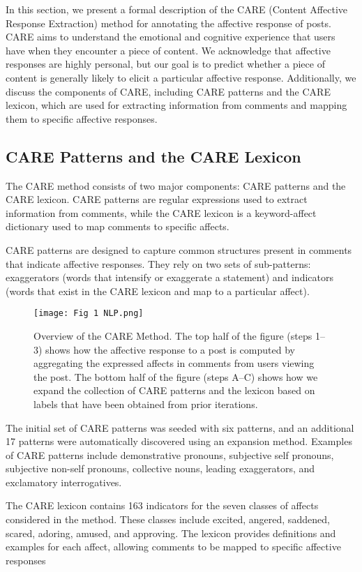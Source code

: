\documentclass[conference]{IEEEtran}
\begin{document}
In this section, we present a formal description of the CARE (Content Affective Response Extraction) method for annotating the affective response of posts. CARE aims to understand the emotional and cognitive experience that users have when they encounter a piece of content. We acknowledge that affective responses are highly personal, but our goal is to predict whether a piece of content is generally likely to elicit a particular affective response. Additionally, we discuss the components of CARE, including CARE patterns and the CARE lexicon, which are used for extracting information from comments and mapping them to specific affective responses.

\subsection{CARE Patterns and the CARE Lexicon}

The CARE method consists of two major components: CARE patterns and the CARE lexicon. CARE patterns are regular expressions used to extract information from comments, while the CARE lexicon is a keyword-affect dictionary used to map comments to specific affects.

CARE patterns are designed to capture common structures present in comments that indicate affective responses. They rely on two sets of sub-patterns: exaggerators (words that intensify or exaggerate a statement) and indicators (words that exist in the CARE lexicon and map to a particular affect).
\begin{figure}[h]
    \centering
    \texttt{[image: Fig 1 NLP.png]}
    \caption{Overview of the CARE Method. The top half of the figure
(steps 1–3) shows how the affective response to a post
is computed by aggregating the expressed affects in
comments from users viewing the post. The bottom
half of the figure (steps A–C) shows how we expand the
collection of CARE patterns and the lexicon based on
labels that have been obtained from prior iterations.}
    \label{fig:2}
\end{figure}
The initial set of CARE patterns was seeded with six patterns, and an additional 17 patterns were automatically discovered using an expansion method. Examples of CARE patterns include demonstrative pronouns, subjective self pronouns, subjective non-self pronouns, collective nouns, leading exaggerators, and exclamatory interrogatives.

The CARE lexicon contains 163 indicators for the seven classes of affects considered in the method. These classes include excited, angered, saddened, scared, adoring, amused, and approving. The lexicon provides definitions and examples for each affect, allowing comments to be mapped to specific affective responses
\end{document}
